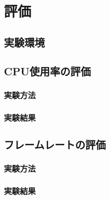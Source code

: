 \chapter{評価}

\section{実験環境}

\section{CPU使用率の評価}

\subsection{実験方法}

\subsection{実験結果}

\section{フレームレートの評価}

\subsection{実験方法}

\subsection{実験結果}